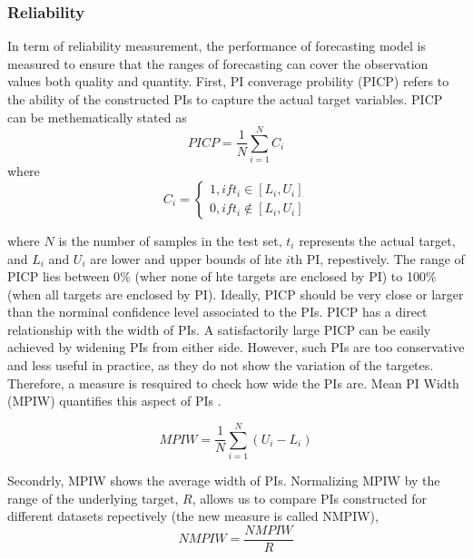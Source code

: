 \documentclass[review]{elsarticle}
\begin{document}
    \subsubsection{Reliability}
      In term of reliability measurement, the performance of forecasting model is measured to ensure that the ranges of forecasting can cover the observation values both quality and quantity.
      First,  PI converage probility (PICP) refers to the ability of the constructed PIs to capture the actual target variables. PICP can be methematically stated as
      \begin{equation}
        PICP = \frac{1}{N} \sum_{i=1}^{N} C_{i}
        \label{eq.PICP}
      \end{equation}
      where
      \begin{equation}
        C_{i} =
        \begin{cases}
          1, if t_{i} \in [L_{i},U_{i}] \\
          0, if t_{i} \not\in [L_{i},U_{i}]
        \end{cases}
        \label{eq.Ci}
      \end{equation}

      where $N$ is the number of samples in the test set, $t_{i}$ represents the actual target, and $L_{i}$ and $U_{i}$ are lower and upper bounds of hte $i$th PI, repestively. The range of PICP lies between 0$\%$ (wher none of hte targets are enclosed by PI) to 100$\%$ (when all targets are enclosed by PI). Ideally, PICP should be very close or larger than the norminal confidence level associated to the PIs.
      PICP has a direct relationship with the width of PIs. A satisfactorily large PICP can be easily achieved by widening PIs from either side. However, such PIs are too conservative and less useful in practice, as they do not show the variation of the targetes. Therefore, a measure is resquired to check how wide the PIs are. Mean PI Width (MPIW) quantifies this aspect of PIs \cite{Khosravi2010}.

      \begin{equation}
        MPIW = \frac{1}{N} \sum_{i=1}^{N} (U_{i}-L_{i})
        \label{eq.MPIW}
      \end{equation}

      Secondrly, MPIW shows the average width of PIs. Normalizing MPIW by the range of the underlying target, $R$, allows us to compare PIs constructed for different datasets repectively (the new measure is called NMPIW),
      \begin{equation}
        NMPIW = \frac{NMPIW}{R}
        \label{eq.NMPIW}
      \end{equation}
\end{document}
